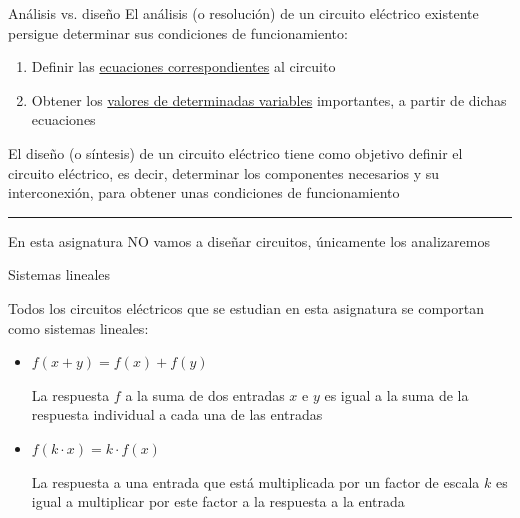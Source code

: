 \documentclass[aspectratio=169, xcolor={usenames,svgnames,dvipsnames}]{beamer}
\begin{document}

\begin{frame}{Análisis vs. diseño}
    El \alert{análisis} (o resolución) de un circuito eléctrico existente persigue determinar sus condiciones de funcionamiento:
    \begin{enumerate}
    \item Definir las \underline{ecuaciones correspondientes} al circuito

    \vspace{2mm}
    \item Obtener los \underline{valores de determinadas variables} importantes, a partir de dichas ecuaciones
    \end{enumerate}
    
    \vspace{6mm}
    
    El \alert{diseño} (o síntesis) de un circuito eléctrico tiene como objetivo definir el circuito eléctrico, es decir, determinar los componentes necesarios y su interconexión, para obtener unas condiciones de funcionamiento

    \vspace{1mm}
    
    \noindent\rule{\textwidth}{0.5pt}

    \vspace{1mm}
    
    En esta asignatura \alert{NO} vamos a diseñar circuitos, únicamente \alert{los analizaremos}
\end{frame}


\begin{frame}{Sistemas lineales}

    \vspace{2mm}
    Todos los circuitos eléctricos que se estudian en esta asignatura se comportan como \alert{sistemas lineales}: 
    
    \vspace{5mm}
    \begin{itemize}
    \item \(f(x + y) = f(x) + f(y)\)

    \vspace{2mm}
    La respuesta \(f\) a la suma de dos entradas \(x\) e \(y\) es igual a la suma de la respuesta individual a cada una de las entradas
    
    \vspace{5mm}
    \item \(f(k \cdot x) = k \cdot f(x)\)

    \vspace{2mm}
    La respuesta a una entrada que está multiplicada por un factor de escala \(k\) es igual a multiplicar por este factor a la respuesta a la entrada
    \end{itemize}
\end{frame}
\end{document}

